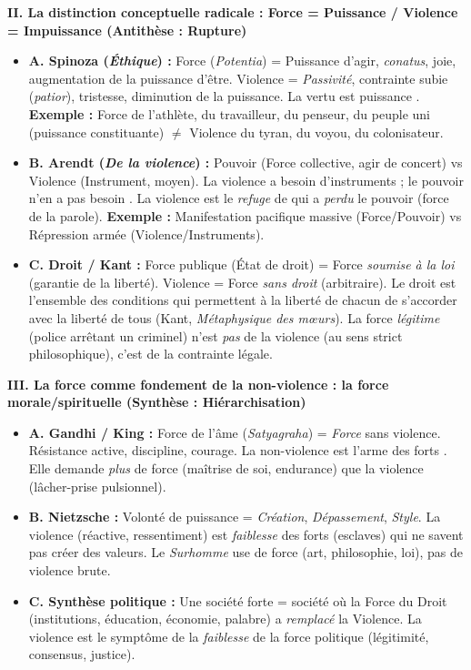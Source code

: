 \documentclass[11pt]{article}
\newcommand{\cle}[1]{{\popxbold\color{popdark}#1}}
\begin{document}
\begin{exoresolu}
\textbf{II. La distinction conceptuelle radicale : Force = Puissance / Violence = Impuissance (Antithèse : Rupture)}
\begin{itemize}
    \item \textbf{A. Spinoza (\emph{Éthique}) :} \cle{Force} (\emph{Potentia}) = \cle{Puissance} d'agir, \emph{conatus}, joie, augmentation de la puissance d'être. \cle{Violence} = \emph{Passivité}, contrainte subie (\emph{patior}), tristesse, diminution de la puissance. \guillemotleft La vertu est puissance \guillemotright. \textbf{Exemple :} Force de l'athlète, du travailleur, du penseur, du peuple uni (puissance constituante) $\neq$ Violence du tyran, du voyou, du colonisateur.
    \item \textbf{B. Arendt (\emph{De la violence}) :} \cle{Pouvoir} (Force collective, agir de concert) vs \cle{Violence} (Instrument, moyen). \guillemotleft La violence a besoin d'instruments ; le pouvoir n'en a pas besoin \guillemotright. La violence est le \emph{refuge} de qui a \emph{perdu} le pouvoir (force de la parole). \textbf{Exemple :} Manifestation pacifique massive (Force/Pouvoir) vs Répression armée (Violence/Instruments).
    \item \textbf{C. Droit / Kant :} \cle{Force publique} (État de droit) = Force \emph{soumise à la loi} (garantie de la liberté). \cle{Violence} = Force \emph{sans droit} (arbitraire). \guillemotleft Le droit est l'ensemble des conditions qui permettent à la liberté de chacun de s'accorder avec la liberté de tous \guillemotright (Kant, \emph{Métaphysique des mœurs}). La force \emph{légitime} (police arrêtant un criminel) n'est \emph{pas} de la violence (au sens strict philosophique), c'est de la \cle{contrainte légale}.
\end{itemize}

\textbf{III. La force comme fondement de la non-violence : la force morale/spirituelle (Synthèse : Hiérarchisation)}
\begin{itemize}
    \item \textbf{A. Gandhi / King :} \cle{Force de l'âme} (\emph{Satyagraha}) = \emph{Force} sans violence. Résistance active, discipline, courage. \guillemotleft La non-violence est l'arme des forts \guillemotright. Elle demande \emph{plus} de force (maîtrise de soi, endurance) que la violence (lâcher-prise pulsionnel).
    \item \textbf{B. Nietzsche :} \cle{Volonté de puissance} = \emph{Création}, \emph{Dépassement}, \emph{Style}. La violence (réactive, ressentiment) est \emph{faiblesse} des forts (esclaves) qui ne savent pas créer des valeurs. Le \emph{Surhomme} use de force (art, philosophie, loi), pas de violence brute.
    \item \textbf{C. Synthèse politique :} Une société forte = société où la \cle{Force du Droit} (institutions, éducation, économie, palabre) a \emph{remplacé} la \cle{Violence}. La violence est le symptôme de la \emph{faiblesse} de la force politique (légitimité, consensus, justice).
\end{itemize}


\end{exoresolu}
\end{document}
